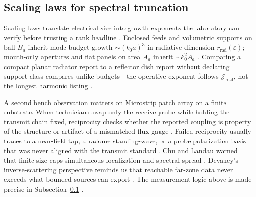 \subsection{Scaling laws for spectral truncation}
\label{sec:ch462}
Scaling laws translate electrical size into growth exponents the laboratory can verify before trusting a rank headline \cite{stratton1941}. Enclosed feeds and volumetric supports on ball $B_a$ inherit mode-budget growth $\sim (k_0 a)^3$ in radiative dimension $r_{\mathrm{rad}}(\varepsilon)$; mouth-only apertures and flat panels on area $A_a$ inherit $\sim k_0^2 A_a$ \cite{harrington2001}. Comparing a compact planar radiator report to a reflector dish report without declaring support class compares unlike budgets---the operative exponent follows $\mathcal{J}_{\mathrm{real}}$, not the longest harmonic listing \cite{devaney2004}.
\begin{physicalvignette}
A second bench observation matters on Microstrip patch array on a finite substrate. When technicians swap only the receive probe while holding the transmit chain fixed, reciprocity checks whether the reported coupling is property of the structure or artifact of a mismatched flux gauge \cite{stratton1941}. Failed reciprocity usually traces to a near-field tap, a radome standing-wave, or a probe polarization basis that was never aligned with the transmit standard \cite{hansen1988}.
Chu and Landau warned that finite size caps simultaneous localization and spectral spread \cite{chu1948}. Devaney's inverse-scattering perspective reminds us that reachable far-zone data never exceeds what bounded sources can export \cite{devaney2004}.
The measurement logic above is made precise in Subsection~\ref{sec:ch462} \cite{stratton1941}.
\end{physicalvignette}
